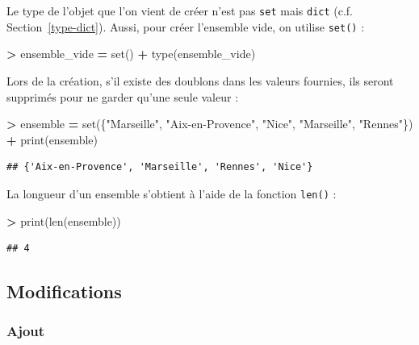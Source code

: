 \documentclass[12pt,]{book}
\newenvironment{Shaded}{\begin{snugshade}}{\end{snugshade}}
\newcommand{\StringTok}[1]{\textcolor[rgb]{0.31,0.60,0.02}{#1}}
\newcommand{\OperatorTok}[1]{\textcolor[rgb]{0.81,0.36,0.00}{\textbf{#1}}}
\newcommand{\BuiltInTok}[1]{#1}
\newcommand{\NormalTok}[1]{#1}
\numberwithin{equation}{section}
\numberwithin{countremarque}{section}
\begin{document}
Le type de l'objet que l'on vient de créer n'est pas \texttt{set} mais
\texttt{dict} (c.f. Section~\ref{type-dict}). Aussi, pour créer
l'ensemble vide, on utilise \texttt{set()} :

\begin{Shaded}
\begin{Highlighting}[]
\OperatorTok{>}\NormalTok{ ensemble_vide }\OperatorTok{=} \BuiltInTok{set}\NormalTok{()}
\OperatorTok{+} \BuiltInTok{type}\NormalTok{(ensemble_vide)}
\end{Highlighting}
\end{Shaded}

Lors de la création, s'il existe des doublons dans les valeurs fournies,
ils seront supprimés pour ne garder qu'une seule valeur :

\begin{Shaded}
\begin{Highlighting}[]
\OperatorTok{>}\NormalTok{ ensemble }\OperatorTok{=} \BuiltInTok{set}\NormalTok{(\{}\StringTok{"Marseille"}\NormalTok{, }\StringTok{"Aix-en-Provence"}\NormalTok{, }\StringTok{"Nice"}\NormalTok{, }\StringTok{"Marseille"}\NormalTok{, }\StringTok{"Rennes"}\NormalTok{\})}
\OperatorTok{+} \BuiltInTok{print}\NormalTok{(ensemble)}
\end{Highlighting}
\end{Shaded}

\begin{lstlisting}
## {'Aix-en-Provence', 'Marseille', 'Rennes', 'Nice'}
\end{lstlisting}

La longueur d'un ensemble s'obtient à l'aide de la fonction
\texttt{len()} :

\begin{Shaded}
\begin{Highlighting}[]
\OperatorTok{>} \BuiltInTok{print}\NormalTok{(}\BuiltInTok{len}\NormalTok{(ensemble))}
\end{Highlighting}
\end{Shaded}

\begin{lstlisting}
## 4
\end{lstlisting}

\subsection{Modifications}\label{modifications}

\subsubsection{Ajout}\label{ajout}
\end{document}

